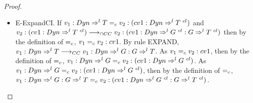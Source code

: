 \documentclass[a4paper]{article}
\begin{document}
\begin{proof}
\begin{itemize}
\begin{itemize}
\begin{itemize}
            \item E-ExpandCI.
            If $v_1 : \Dyn \Rightarrow^l T \equalityCasts v_2 : (cv1 : \Dyn \Rightarrow^l T\ ^{cl})$ and $v_2 : (cv1 : Dyn \Rightarrow^l T\ ^{cl}) \longrightarrow_{\cap CC} v_2 : (cv1 : Dyn \Rightarrow^l G\ ^{cl} : G \Rightarrow^l T\ ^{cl})$ then by the definition of $=_c$, $v_1 =_c v_2 : cv1$.
            By rule EXPAND, $v_1 : Dyn \Rightarrow^l T \longrightarrow_{CC} v_1 : Dyn \Rightarrow^l G : G \Rightarrow^l T$.
            As $v_1 =_c v_2 : cv1$, then by the definition of $=_c$, $v_1 : Dyn \Rightarrow^l G =_c v_2 : (cv1 : Dyn \Rightarrow^l G\ ^{cl})$.
            As $v_1 : Dyn \Rightarrow^l G =_c v_2 : (cv1 : Dyn \Rightarrow^l G\ ^{cl})$, then by the definition of $=_c$, $v_1 : Dyn \Rightarrow^l G : G \Rightarrow^l T =_c v_2 : (cv1 : Dyn \Rightarrow^l G\ ^{cl} : G \Rightarrow^l T\ ^{cl})$.
        \end{itemize}
    \end{itemize}
\end{itemize}
\end{proof}
\end{document}
